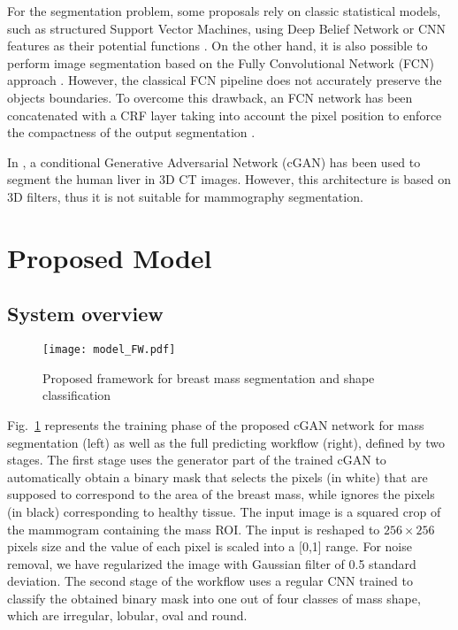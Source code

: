 \documentclass[runningheads,a4paper]{llncs}
\begin{document}
For the segmentation problem, some proposals rely on classic statistical models, such as structured Support Vector Machines, using Deep Belief Network or CNN features as their potential functions \cite{dhungel2015deep}. On the other hand, it is also possible to perform image segmentation based on the Fully Convolutional Network (FCN) approach \cite{long2015fully}. However, the classical FCN pipeline does not accurately preserve the objects boundaries. To overcome this drawback, an FCN network has been concatenated with a CRF layer taking into account the pixel position to enforce the compactness of the output segmentation \cite{zhu2016adversarial}.

In \cite{yang2017automatic}, a conditional Generative Adversarial Network (cGAN) has been used to segment the human liver in 3D CT images. However, this architecture is based on 3D filters, thus it is not suitable for mammography segmentation.


\section{Proposed Model}

\subsection{System overview}
\begin{figure}[!h]
\centering
\texttt{[image: model\_FW.pdf]}
\caption{Proposed framework for breast mass segmentation and shape classification}
\label{fig1:model}
\end{figure}


Fig.~\ref{fig1:model} represents the training phase of the proposed cGAN network for mass segmentation (left) as well as the full predicting workflow (right), defined by two stages. The first stage uses the generator part of the trained cGAN to automatically obtain a binary mask that selects the pixels (in white) that are supposed to correspond to the area of the breast mass, while ignores the pixels (in black) corresponding to healthy tissue. The input image is a squared crop of the mammogram containing the mass ROI. The input is reshaped to $256\times 256$ pixels size and the value of each pixel is scaled into a [0,1] range. For noise removal, we have regularized the image with Gaussian filter of 0.5 standard deviation. The second stage of the workflow uses a regular CNN trained to classify the obtained binary mask into one out of four classes of mass shape, which are irregular, lobular, oval and round.
\end{document}
